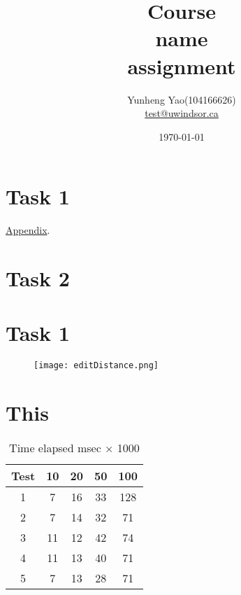 \documentclass[12pt]{article}
\title{ Course\\ name \\ assignment}
\author
{
	Yunheng Yao(104166626)\\
	\href{mailto:test@uwindsor.ca}{test@uwindsor.ca}
}
\date{\today}
\begin{document}
\maketitle
\thispagestyle{empty}
\section*{Task 1}
\hyperref[figure:1]{Appendix}.
\section*{Task 2}
\newpage
\appendix
\section{Task 1}
\begin{figure}[H]
\label{figure:1}
\texttt{[image: editDistance.png]}
\end{figure}
\section{This}
\begin{figure}[H]
\label{diagram:1}

\end{figure}
\begin{table}[H]
	\centering
	\label{table:1}
	\begin{tabular}{|c|c|c|c|c|}
		\hline
		Test&10&20&50&100\\
		\hline
		1&7&16&33&128\\
		2&7&14&32&71\\
		3&11&12&42&74\\
		4&11&13&40&71\\
		5&7&13&28&71\\
		\hline
	\end{tabular}
	\caption{Time elapsed msec $\times$ 1000}
\end{table}
\newpage


\end{document}
